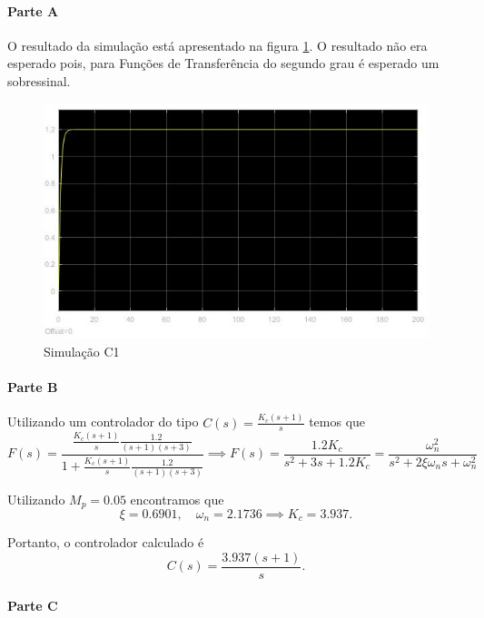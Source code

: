 \documentclass[
]{book}
\theoremstyle{definition}
\theoremstyle{definition}
\theoremstyle{definition}
\theoremstyle{remark}
\begin{document}
\hypertarget{parte-a-2}{%
\paragraph*{Parte A}\label{parte-a-2}}

O resultado da simulação está apresentado na figura \ref{fig:prob3A1}. O resultado não era esperado pois, para Funções de Transferência do segundo grau é esperado um sobressinal.

\begin{figure}

{\centering \includegraphics[width=0.8\linewidth]{Imagens/Lab5/Resolução/prob3A1} 

}

\caption{Simulação C1}\label{fig:prob3A1}
\end{figure}

\hypertarget{parte-b-2}{%
\paragraph*{Parte B}\label{parte-b-2}}

Utilizando um controlador do tipo \(C(s) = \frac{K_c(s+1)}{s}\) temos que
\[
F(s) = \frac{\frac{K_c(s+1)}{s}\frac{1.2}{(s+1)(s+3)}}{1+\frac{K_c(s+1)}{s}\frac{1.2}{(s+1)(s+3)}} \implies \boxed{F(s) = \frac{1.2K_c}{s^2+3s+1.2K_c} = \frac{\omega_n^2}{s^2+2\xi\omega_ns+\omega_n^2}}
\]

Utilizando \(M_p = 0.05\) encontramos que
\[
\xi = 0.6901, \quad \omega_n = 2.1736 \implies K_c =3.937.
\]

Portanto, o controlador calculado é
\[
\boxed{C(s) = \frac{3.937(s+1)}{s}}.
\]

\hypertarget{parte-c-2}{%
\paragraph*{Parte C}\label{parte-c-2}}
\end{document}
